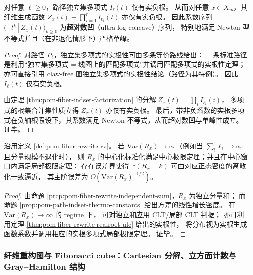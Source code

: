 \begin{theorem}\label{thm:pom-fiber-rewrite-realroot-ulc}
对任意 \(\ell\ge 0\)，路径独立集多项式 \(I_{\ell}(t)\) 仅有实负根。
从而对任意 \(x\in X_m\)，其纤维生成函数
\(
Z_x(t)=\prod_{i=1}^r I_{\ell_i}(t)
\)
亦仅有实负根。
因此系数序列 \(\bigl([t^k]Z_x(t)\bigr)_{k\ge 0}\) 为\textbf{超对数凹}（ultra log-concave）序列，
特别地满足 Newton 型不等式并且（在非退化情形下）严格单峰。
\end{theorem}
\begin{proof}
对路径 \(P_{\ell}\)，独立集多项式的实根性可由多条等价路线给出：
一条标准路径是利用“独立集多项式 = 线图上的匹配多项式”并调用匹配多项式的实根性定理；
亦可直接引用 claw-free 图独立集多项式的实根性结论（路径为其特例）。
因此 \(I_{\ell}(t)\) 仅有实负根。
\par
由定理 \ref{thm:pom-fiber-indset-factorization} 的分解 \(Z_x(t)=\prod_i I_{\ell_i}(t)\)，
多项式的根集合并集性质立得 \(Z_x(t)\) 亦仅有实负根。
最后，带非负系数的实根多项式在负轴根假设下，其系数满足 Newton 不等式，从而超对数凹与单峰性成立。证毕。
\end{proof}



\begin{corollary}\label{cor:pom-fiber-rewrite-local-clt}
沿用定义 \ref{def:pom-fiber-rewrite-rv}。
若 \(\mathrm{Var}(R_x)\to\infty\)（例如当 \(\sum_i \ell_i\to\infty\) 且分量规模不退化时），
则 \(R_x\) 的中心化标准化满足中心极限定理；并且在中心窗口内满足局部极限定理：
存在误差界使得 \(\mathbb P(R_x=k)\) 可由对应正态密度的离散化一致逼近，
其主阶误差为 \(O(\mathrm{Var}(R_x)^{-1/2})\)。
\end{corollary}
\begin{proof}
由命题 \ref{prop:pom-fiber-rewrite-independent-sum}，\(R_x\) 为独立分量和；
而命题 \ref{prop:pom-path-indset-thermo-constants} 给出方差的线性增长密度。
在 \(\mathrm{Var}(R_x)\to\infty\) 的 regime 下，
可对独立和应用 CLT/局部 CLT 判据；
亦可利用定理 \ref{thm:pom-fiber-rewrite-realroot-ulc} 给出的实根性，
将分布视为实根生成函数系数并调用相应的实根多项式局部极限定理。
证毕。
\end{proof}

\subsubsection{纤维重构图与 Fibonacci cube：Cartesian 分解、立方面计数与 Gray--Hamilton 结构}\label{subsubsec:pom-fiber-reconstruction-cubical}

